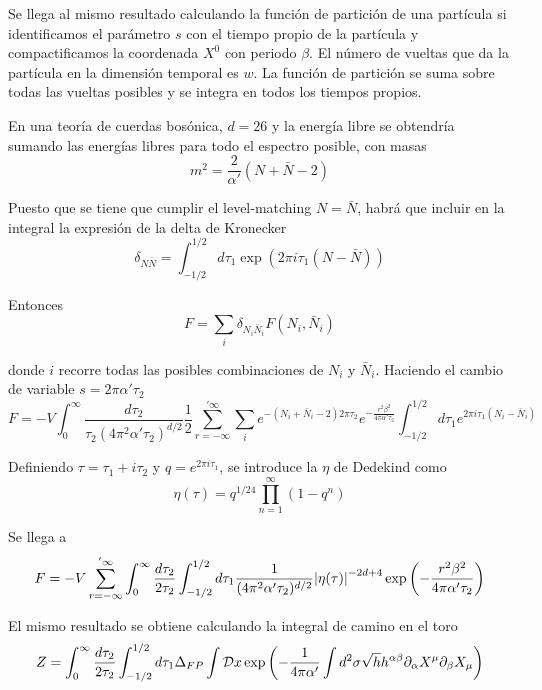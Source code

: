 Se llega al mismo resultado calculando la función de partición de una partícula  si identificamos 
el parámetro $s$ con el tiempo propio  de la partícula y compactificamos 
la coordenada $X^0$ con periodo $\beta$. El número de vueltas que da la
partícula en la dimensión temporal es $w$. La función de partición se suma sobre
todas las vueltas posibles y se integra en todos los tiempos propios.

En una teoría de cuerdas bosónica, $d=26$ y la energía libre se obtendría sumando las
energías libres para todo el espectro posible, con masas
\begin{equation}
  m^2=\frac{2}{\alpha'}(N+\bar N-2)
\end{equation}

Puesto que se tiene que cumplir el level-matching $N=\bar N$, habrá que incluir en la 
integral la expresión de la delta de Kronecker
\begin{equation}
   \delta_{N\bar N}=\int_{-1/2}^{1/2}d\tau_1 \exp(2\pi i\tau_1 (N-\bar N))
\end{equation}

Entonces
\begin{equation}
  F=\sum_i \delta_{N_i \bar N_i} F(N_i,\bar N_i)
\end{equation}

donde $i$ recorre todas las posibles combinaciones de $N_i$ y $\bar N_i$.
Haciendo el cambio de variable $s=2\pi\alpha'\tau_2$
\begin{equation}
  F=-V \int_0^\infty \frac{d\tau_2}{\tau_2(4\pi^2\alpha'\tau_2)^{d/2}}\frac 1 2\sum_{r=-\infty}^{'\infty} 
  \sum_i e^{-(N_i+\bar N_i -2)2\pi\tau_2} e^{-\frac{r^2\beta^2}{4\pi\alpha'\tau_2}}\int_{-1/2}^{1/2} d\tau_1 e^{2\pi i\tau_1(N_i-\bar N_i)}
\end{equation}

Definiendo $\tau=\tau_1+i\tau_2$ y $q=e^{2\pi i\tau_1}$, se introduce la $\eta$ de 
Dedekind como
\begin{equation}
  \eta(\tau)=q^{1/24}\prod_{n=1}^{\infty} (1-q^n)
\end{equation}

Se llega a
\begin{equation}
  F=-V \sum_{r=-\infty}^{'\infty} \int_0^\infty\frac{d\tau_2}{2\tau_2} \int_{-1/2}^{1/2} d\tau_1  \frac{1}{(4\pi^2\alpha'\tau_2)^{d/2}}
  \abs{\eta(\tau)}^{-2d+4}\exp\qty(-\frac{r^2\beta^2}{4\pi\alpha'\tau_2})
\end{equation}

El mismo resultado se obtiene calculando la integral de camino en el toro
\begin{equation}
  Z= \int_0^\infty\frac{d\tau_2}{2\tau_2} \int_{-1/2}^{1/2} d\tau_1 \Delta_{FP} \int \mathcal Dx
  \exp\qty(-\frac{1}{4\pi\alpha'}\int d^2\sigma \sqrt h h^{\alpha\beta}\partial_\alpha X^\mu \partial_\beta X_\mu)
\end{equation}

